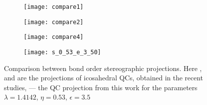 \begin{figure}
\centering
\begin{subfigure}{.19\textwidth}
  \centering
  \texttt{[image: compare1]}
  \caption{}
  \label{fig:compare1} 
\end{subfigure}
\begin{subfigure}{.19\textwidth}
  \centering
   \texttt{[image: compare2]}
  \caption{}
  \label{fig:compare2}  
\end{subfigure}
\begin{subfigure}{.19\textwidth}
  \centering
  \texttt{[image: compare4]}
  \caption{}
  \label{fig:compare4} 
\end{subfigure}
\begin{subfigure}{.19\textwidth}
  \centering
   \texttt{[image: s\_0\_53\_e\_3\_50]}
  \caption{}
  \label{fig:myqc1}  
\end{subfigure}
\caption{Comparison between bond order stereographic projections. Here ,  %
and  are the projections of icosahedral QCs, obtained in the recent studies,\cite{methods, compareicos} %
--- the QC projection from this work for the parameters %
$\lambda=1.4142$, $\eta=0.53$, $\epsilon=3.5$ %
}
\label{fig:stereocompare}
\end{figure}




